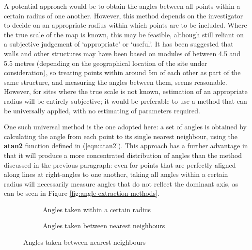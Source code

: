 \documentclass[../../ArchStats.tex]{subfiles}
\begin{document}
A potential approach would be to obtain the angles between all points within a certain radius of one another. However, this method depends on the investigator to decide on an appropriate radius within which points are to be included. Where the true scale of the map is known, this may be feasible, although still  reliant on a subjective judgement of `appropriate' or `useful'. It has been suggested \cite{Kendall2014} that walls and other structures may have been based on modules of between 4.5 and 5.5 metres (depending on the geographical location of the site under consideration), so treating points within around 5m of each other as part of the same structure, and measuring the angles between them, seems reasonable. However, for sites where the true scale is not known, estimation of an appropriate radius will be entirely subjective; it would be preferable to use a method that can be universally applied, with no estimating of parameters required.

One such universal method is the one adopted here: a set of angles is obtained by calculating the angle from each point to its single nearest neighbour, using the \textbf{atan2} function defined in (\ref{eqn:atan2}).  This approach has a further advantage in that it will produce a more concentrated distribution of angles than the method discussed in the previous paragraph: even for points that are perfectly aligned along lines at right-angles to one another, taking all angles within a certain radius will necessarily measure angles that do not reflect the dominant axis, as can be seen in Figure \ref{fig:angle-extraction-methods}.


\begin{figure}[!h]
\centering
\caption{Comparison of angle extraction methods across a set of points representing the post-holes of a regular structure. Angles are shown on the structure and in a circular plot}
\label{fig:angle-extraction-methods}
%
\begin{subfigure}[t]{0.45\textwidth}
\caption{Angles taken within a certain radius}
\end{subfigure}
%
%
\begin{subfigure}[t]{0.45\textwidth}
\caption{Angles taken between nearest neighbours}
\end{subfigure}
%
%
\end{figure}
\end{document}
